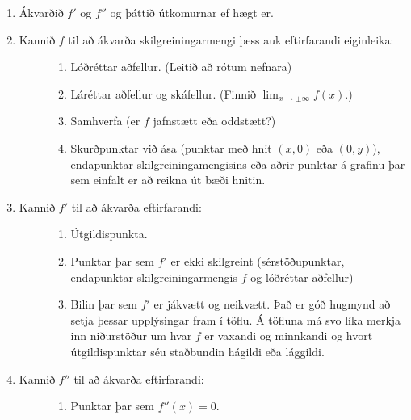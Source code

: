 \documentclass[a4paper,10pt,icelandic]{sphinxmanual}
\begin{document}
\begin{enumerate}
\item {} 
Ákvarðið \(f'\) og \(f''\) og þáttið útkomurnar ef hægt er.

\item {} \begin{description}
\item[{Kannið \(f\) til að ákvarða skilgreiningarmengi þess auk eftirfarandi eiginleika:}] \leavevmode\begin{enumerate}
\item {} 
Lóðréttar aðfellur. (Leitið að rótum nefnara)

\item {} 
Láréttar aðfellur og skáfellur. (Finnið \(\lim_{x \to \pm\infty}f(x)\).)

\item {} 
Samhverfa (er \(f\) jafnstætt eða oddstætt?)

\item {} 
Skurðpunktar við ása (punktar með hnit \((x,0)\) eða \((0,y)\)), endapunktar skilgreiningamengisins eða aðrir punktar á grafinu þar sem einfalt er að reikna út bæði hnitin.

\end{enumerate}

\end{description}

\item {} \begin{description}
\item[{Kannið \(f'\) til að ákvarða eftirfarandi:}] \leavevmode\begin{enumerate}
\item {} 
Útgildispunkta.

\item {} 
Punktar þar sem \(f'\) er ekki skilgreint (sérstöðupunktar, endapunktar skilgreiningarmengis \(f\) og lóðréttar aðfellur)

\item {} 
Bilin þar sem \(f'\) er jákvætt
og neikvætt. Það er góð hugmynd að setja þessar upplýsingar fram í töflu. Á töfluna má svo líka merkja inn niðurstöður um hvar \(f\) er vaxandi og minnkandi og hvort útgildispunktar séu staðbundin hágildi eða lággildi.

\end{enumerate}

\end{description}

\item {} \begin{description}
\item[{Kannið \(f''\) til að ákvarða eftirfarandi:}] \leavevmode\begin{enumerate}
\item {} 
Punktar þar sem \(f''(x)=0\).


\end{enumerate}
\end{description}
\end{enumerate}
\end{document}
